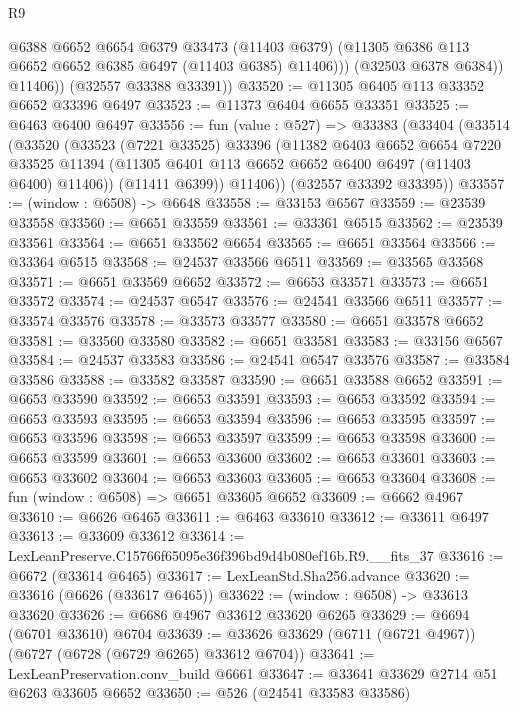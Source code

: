 \begin{lexlean}{R9}
\begin{coremodule}
                @6388
                @6652
                @6654
                @6379
                @33473
                (@11403 @6379)
                (@11305 @6386 @113 @6652 @6652 @6385 @6497 (@11403 @6385) @11406)))
            (@32503 @6378 @6384))
          @11406))
      (@32557 @33388 @33391))
@33520 := @11305 @6405 @113 @33352 @6652 @33396 @6497
@33523 := @11373 @6404 @6655 @33351
@33525 := @6463 @6400 @6497
@33556 := fun (value : @527) =>
  @33383
    (@33404
      (@33514
        (@33520
          (@33523
            (@7221 @33525)
            @33396
            (@11382
              @6403
              @6652
              @6654
              @7220
              @33525
              @11394
              (@11305 @6401 @113 @6652 @6652 @6400 @6497 (@11403 @6400) @11406))
            (@11411 @6399))
          @11406))
      (@32557 @33392 @33395))
@33557 := (window : @6508) -> @6648
@33558 := @33153 @6567
@33559 := @23539 @33558
@33560 := @6651 @33559
@33561 := @33361 @6515
@33562 := @23539 @33561
@33564 := @6651 @33562 @6654
@33565 := @6651 @33564
@33566 := @33364 @6515
@33568 := @24537 @33566 @6511
@33569 := @33565 @33568
@33571 := @6651 @33569 @6652
@33572 := @6653 @33571
@33573 := @6651 @33572
@33574 := @24537 @6547
@33576 := @24541 @33566 @6511
@33577 := @33574 @33576
@33578 := @33573 @33577
@33580 := @6651 @33578 @6652
@33581 := @33560 @33580
@33582 := @6651 @33581
@33583 := @33156 @6567
@33584 := @24537 @33583
@33586 := @24541 @6547 @33576
@33587 := @33584 @33586
@33588 := @33582 @33587
@33590 := @6651 @33588 @6652
@33591 := @6653 @33590
@33592 := @6653 @33591
@33593 := @6653 @33592
@33594 := @6653 @33593
@33595 := @6653 @33594
@33596 := @6653 @33595
@33597 := @6653 @33596
@33598 := @6653 @33597
@33599 := @6653 @33598
@33600 := @6653 @33599
@33601 := @6653 @33600
@33602 := @6653 @33601
@33603 := @6653 @33602
@33604 := @6653 @33603
@33605 := @6653 @33604
@33608 := fun (window : @6508) => @6651 @33605 @6652
@33609 := @6662 @4967
@33610 := @6626 @6465
@33611 := @6463 @33610
@33612 := @33611 @6497
@33613 := @33609 @33612
@33614 := LexLeanPreserve.C15766f65095e36f396bd9d4b080ef16b.R9.__fits_37
@33616 := @6672 (@33614 @6465)
@33617 := LexLeanStd.Sha256.advance
@33620 := @33616 (@6626 (@33617 @6465))
@33622 := (window : @6508) -> @33613 @33620
@33626 := @6686 @4967 @33612 @33620 @6265
@33629 := @6694 (@6701 @33610) @6704
@33639 := @33626 @33629 (@6711 (@6721 @4967)) (@6727 (@6728 (@6729 @6265) @33612 @6704))
@33641 := LexLeanPreservation.conv_build @6661
@33647 := @33641 @33629 @2714 @51 @6263 @33605 @6652
@33650 := @526 (@24541 @33583 @33586)

\end{coremodule}
\end{lexlean}
